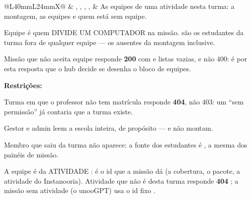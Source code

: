 \begin{tabularx}{\linewidth}{@{}L{40mm}L{24mm}X@{}}
\zebra {} & , , , ,  & As equipes de uma atividade nesta turma: a montagem, as equipes e quem está sem equipe.\par Equipe é quem DIVIDE UM COMPUTADOR na missão.  são os estudantes da turma fora de qualquer equipe --- os ausentes da montagem inclusive.\par Missão que não aceita equipe responde \textbf{200} com  e listas vazias, e não 400: é por esta resposta que o hub decide se desenha o bloco de equipes.\par \textbf{Restrições:}\par \hspace*{1em}\textbullet{} Turma em que o professor não tem matrícula responde \textbf{404}, não 403: um \enquote{sem permissão} já contaria que a turma existe.\par \hspace*{1em}\textbullet{} Gestor e admin leem a escola inteira, de propósito --- e não montam.\par \hspace*{1em}\textbullet{} Membro que saiu da turma não aparece: a fonte dos estudantes é , a mesma dos painéis de missão.\par \hspace*{1em}\textbullet{} A equipe é da ATIVIDADE :  é o id que a missão dá (a cobertura, o pacote, a atividade do Instanooria). Atividade que não é desta turma responde \textbf{404} ; a missão sem atividade (o unooGPT) usa o id fixo .\\

\end{tabularx}

